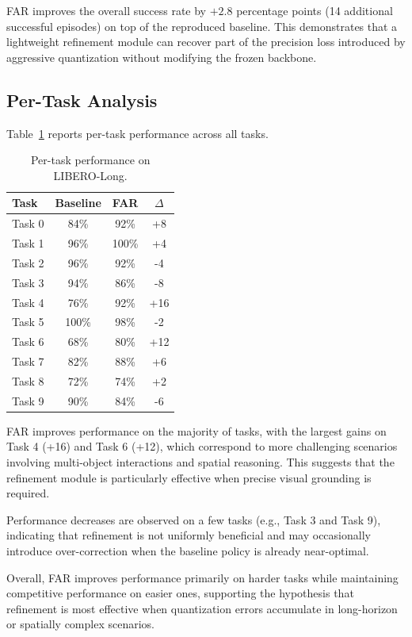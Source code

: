 \documentclass[conference]{IEEEtran}
\begin{document}
FAR improves the overall success rate by $\mathbf{+2.8}$ percentage points (14 additional successful episodes) on top of the reproduced baseline. This demonstrates that a lightweight refinement module can recover part of the precision loss introduced by aggressive quantization without modifying the frozen backbone.

\subsection{Per-Task Analysis}
Table~\ref{tab:per_task} reports per-task performance across all tasks.
\begin{table}[t]
\centering
\caption{Per-task performance on LIBERO-Long.}
\label{tab:per_task}
\small
\setlength{\tabcolsep}{4pt}
\begin{tabular}{lccc}
\toprule
Task & Baseline & FAR & $\Delta$ \\
\midrule
Task 0 & 84\% & 92\% & +8 \\
Task 1 & 96\% & 100\% & +4 \\
Task 2 & 96\% & 92\% & -4 \\
Task 3 & 94\% & 86\% & -8 \\
Task 4 & 76\% & 92\% & +16 \\
Task 5 & 100\% & 98\% & -2 \\
Task 6 & 68\% & 80\% & +12 \\
Task 7 & 82\% & 88\% & +6 \\
Task 8 & 72\% & 74\% & +2 \\
Task 9 & 90\% & 84\% & -6 \\
\bottomrule
\end{tabular}
\end{table}

FAR improves performance on the majority of tasks, with the largest gains on Task 4 (+16) and Task 6 (+12), which correspond to more challenging scenarios involving multi-object interactions and spatial reasoning. This suggests that the refinement module is particularly effective when precise visual grounding is required.

Performance decreases are observed on a few tasks (e.g., Task 3 and Task 9), indicating that refinement is not uniformly beneficial and may occasionally introduce over-correction when the baseline policy is already near-optimal.

Overall, FAR improves performance primarily on harder tasks while maintaining competitive performance on easier ones, supporting the hypothesis that refinement is most effective when quantization errors accumulate in long-horizon or spatially complex scenarios.
\end{document}
